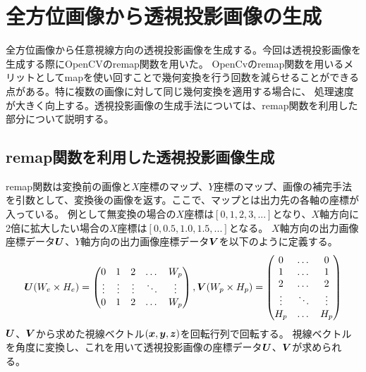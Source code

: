 \documentclass[]{jarticle}          %
\begin{document}
\section{全方位画像から透視投影画像の生成}
全方位画像から任意視線方向の透視投影画像を生成する。今回は透視投影画像を生成する際にOpenCVのremap関数を用いた。
OpenCvのremap関数を用いるメリットとしてmapを使い回すことで幾何変換を行う回数を減らせることができる点がある。特に複数の画像に対して同じ幾何変換を適用する場合に、
処理速度が大きく向上する。透視投影画像の生成手法については、remap関数を利用した部分について説明する。
\subsection{remap関数を利用した透視投影画像生成}
remap関数は変換前の画像と$X$座標のマップ、$Y$座標のマップ、画像の補完手法を引数として、変換後の画像を返す。ここで、マップとは出力先の各軸の座標が入っている。
例として無変換の場合の$X$座標は$[0,1,2,3,...]$となり、$X$軸方向に2倍に拡大したい場合の$X$座標は$[0,0.5,1.0,1.5,...]$となる。
$X$軸方向の出力画像座標データ$\mbox{\boldmath $U$}$、$Y$軸方向の出力画像座標データ$\mbox{\boldmath $V$}$を以下のように定義する。
\begin{equation}
  \mbox{\boldmath $U$}(W_e \times H_e) = 
  \begin{pmatrix}
    0 & 1 & 2 & \dots & W_p \\
    \vdots & \vdots  & \vdots & \ddots & \vdots \\
    0 & 1 & 2 & \dots & W_p \\
  \end{pmatrix}
  ,
  \mbox{\boldmath $V$}(W_p \times H_p) = 
  \begin{pmatrix}
    0 & \dots & 0 \\
    1 & \dots & 1 \\
    2 & \dots & 2 \\
    \vdots & \ddots & \vdots \\
    H_p & \dots & H_p \\
  \end{pmatrix}
\end{equation}
$\mbox{\boldmath $U$}$、$\mbox{\boldmath $V$}$から求めた視線ベクトル$(\mbox{\boldmath $x$},\mbox{\boldmath $y$},\mbox{\boldmath $z$})$を回転行列で回転する。
視線ベクトルを角度に変換し、これを用いて透視投影画像の座標データ$\mbox{\boldmath $U$}$、$\mbox{\boldmath $V$}$が求められる。
\end{document}
